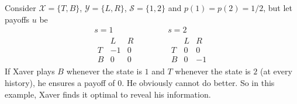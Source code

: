 \documentclass[11pt,letterpaper,reqno,oneside]{article}
\begin{document}
\begin{example}
	\label{example:AM2}
	Consider $\mathcal{X}=\{T,B\}$, $\mathcal{Y}=\{L,R\}$, $\mathcal{S}=\{1,2\}$ and $p(1)=p(2)=1/2$, but let payoffs $u$ be
	\begin{equation*}
		\begin{gathered}
			s=1\\
			\begin{array}{c|ccc}
				  & L & R \\ \hline
				T & -1 & 0 \\
				B & 0 & 0
			\end{array}
		\end{gathered}
		\quad\quad\quad
		\begin{gathered}
			s=2\\
			\begin{array}{c|ccc}
				  & L & R \\ \hline
				T & 0 & 0 \\
				B & 0 & -1
			\end{array} 
		\end{gathered}
	\end{equation*}
	If Xaver plays $B$ whenever the state is $1$ and $T$ whenever the state is $2$ (at every history), he ensures a payoff of $0$. He obviously cannot do better. So in this example, Xaver finds it optimal to reveal his information.
\end{example}
\end{document}
